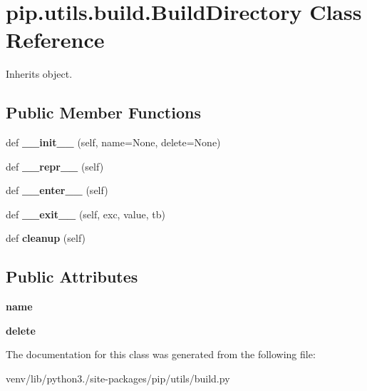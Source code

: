 \hypertarget{classpip_1_1utils_1_1build_1_1_build_directory}{}\section{pip.\+utils.\+build.\+Build\+Directory Class Reference}
\label{classpip_1_1utils_1_1build_1_1_build_directory}


Inherits object.

\subsection*{Public Member Functions}
\begin{DoxyCompactItemize}
\item 
\mbox{\label{classpip_1_1utils_1_1build_1_1_build_directory_a39cb7cdac0fb9ccbf80f8c333f08bde6}} 
def {\bfseries \+\_\+\+\_\+init\+\_\+\+\_\+} (self, name=None, delete=None)
\item 
\mbox{\label{classpip_1_1utils_1_1build_1_1_build_directory_a9e1b64fcd6feccd8f02106077d3a77a7}} 
def {\bfseries \+\_\+\+\_\+repr\+\_\+\+\_\+} (self)
\item 
\mbox{\label{classpip_1_1utils_1_1build_1_1_build_directory_af32e2f58e76f476812509134e21a4cf6}} 
def {\bfseries \+\_\+\+\_\+enter\+\_\+\+\_\+} (self)
\item 
\mbox{\label{classpip_1_1utils_1_1build_1_1_build_directory_a332048e9811eee03cacbdc268588e8a0}} 
def {\bfseries \+\_\+\+\_\+exit\+\_\+\+\_\+} (self, exc, value, tb)
\item 
\mbox{\label{classpip_1_1utils_1_1build_1_1_build_directory_acd89467c30721997c3385ca02b8c82d6}} 
def {\bfseries cleanup} (self)
\end{DoxyCompactItemize}
\subsection*{Public Attributes}
\begin{DoxyCompactItemize}
\item 
\mbox{\label{classpip_1_1utils_1_1build_1_1_build_directory_a787366490b66186a7dc42ddba746dfc5}} 
{\bfseries name}
\item 
\mbox{\label{classpip_1_1utils_1_1build_1_1_build_directory_a9e7c10fd600f4aa7fbd015f7bd7dda9c}} 
{\bfseries delete}
\end{DoxyCompactItemize}


The documentation for this class was generated from the following file\+:\begin{DoxyCompactItemize}
\item 
venv/lib/python3./site-\/packages/pip/utils/build.\+py\end{DoxyCompactItemize}
